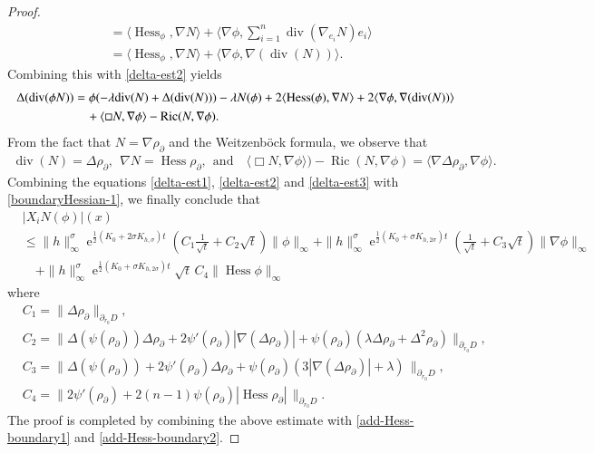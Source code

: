\documentclass[11pt,reqno]{amsart}
\theoremstyle{definition} \newtheorem{remark}[theorem]{Remark}
\numberwithin{equation}{section}
\def\Ric{{\operatorname{Ric}}} \def\Hess{\operatorname{Hess}}
\def\div{{\operatorname{div}}}
\newcommand\1{\mathbbm{1}}
\def\Ric{{\operatorname{Ric}}} \def\Aut{{\operatorname{Aut}}}
\def\r{\right}
\def\l{\left} \def\e{\operatorname{e}} \def\dsum{\displaystyle\sum}
\begin{document}
\begin{proof}
\begin{align*}
 &=\langle \Hess_{\phi}, \nabla N \rangle+\langle \nabla \phi, \sum_{i=1}^n \div(\nabla_{e_i}N)e_i \rangle\\
 &=\langle \Hess_{\phi}, \nabla N \rangle+\langle \nabla \phi, \nabla (\div (N)) \rangle.
 \end{align*}
 Combining this with \eqref{delta-est2} yields
 \begin{align*}
 \Delta (\div (\phi N))
 &=\phi(-\lambda \div(N)+\Delta(\div(N)))-\lambda N(\phi)+2\langle \Hess (\phi), \nabla N \rangle+2\langle\nabla \phi, \nabla (\div(N)) \rangle \notag\\
 &\quad+\langle \Box N, \nabla \phi \rangle-\Ric(N,\nabla\phi).
 \end{align*}
 From the fact that $N=\nabla \rho_{\partial}$ and the Weitzenb\"{o}ck formula, we observe that
 \begin{align}\label{delta-est3}
 \div(N)=\Delta \rho_{\partial},\ \  \nabla N=\Hess \rho_{\partial},\ \  \mbox{and} \quad   \langle \Box N, \nabla \phi \rangle)-\Ric(N,\nabla\phi)=\langle \nabla \Delta \rho_{\partial}, \nabla \phi \rangle.
 \end{align}
 Combining the equations \eqref{delta-est1}, \eqref{delta-est2} and \eqref{delta-est3} with \eqref{boundaryHessian-1},  we finally conclude that
 \begin{align*}
& |X_iN(\phi)|(x)\\
&\leq 
  \|h\|_{\infty}^{\sigma}\e^{\frac{1}{2}(K_0+2\sigma K_{h,\sigma})t}\l(C_1\frac{1}{\sqrt{t}}+C_2\sqrt{t}\r)\|\phi\|_{\infty}+  \|h\|_{\infty}^{\sigma}\e^{\frac{1}{2}(K_0+\sigma K_{h,2\sigma})t}\l(\frac{1}{\sqrt{t}}+C_3\sqrt{t}\r)\|\nabla \phi\|_{\infty}\\
 &\quad  +\|h\|_{\infty}^{\sigma}\e^{\frac{1}{2}(K_0+\sigma K_{h,2\sigma})t}\sqrt{t}\,C_4\|\Hess \phi\|_{\infty}
 \end{align*}
 where 
 \begin{align*}
&C_1= \|\Delta \rho_{\partial} \|_{\partial_{r_0}D}, \\
& C_2 = \| \Delta (\psi (\rho_{\partial}))  \Delta \rho_{\partial}+2 \psi'(\rho_{\partial})|\nabla(\Delta \rho_{\partial})|+\psi(\rho_{\partial})(\lambda \Delta \rho_{\partial}+\Delta^2 \rho_{\partial})\|_{\partial_{r_0}D},\\
&C_3=\|\Delta (\psi (\rho_{\partial}))+2 \psi'(\rho_{\partial}) \Delta \rho_{\partial} +\psi(\rho_{\partial}) (3|\nabla(\Delta \rho_{\partial})|+\lambda)\,\|_{\partial_{r_0}D},\\
&C_4= \|2\psi'(\rho_{\partial})+2(n-1)\psi(\rho_{\partial})|\Hess \rho_{\partial}|\,\|_{\partial_{r_0}D}.
 \end{align*}
 The proof is completed by combining the above estimate with \eqref{add-Hess-boundary1} and
 \eqref{add-Hess-boundary2}.
 \end{proof}
\end{document}
